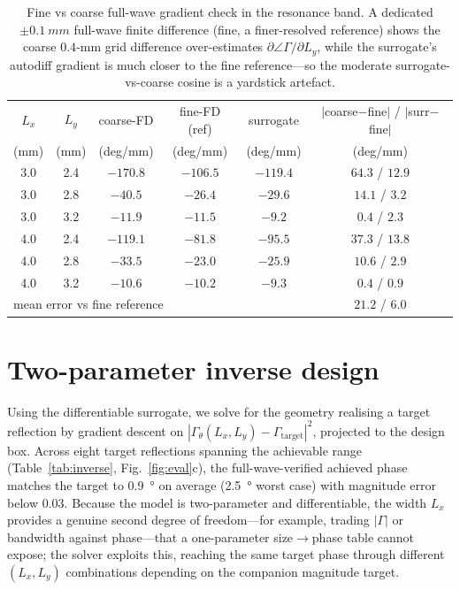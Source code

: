 \documentclass[11pt]{article}
\begin{document}
\begin{table}[!ht]\centering\small
\caption{Fine vs coarse full-wave gradient check in the resonance band. A dedicated $\pm\SI{0.1}{mm}$
full-wave finite difference (fine, a finer-resolved reference) shows the coarse $0.4$-mm grid difference
over-estimates $\partial\angle\Gamma/\partial L_y$, while the surrogate's autodiff gradient is much closer
to the fine reference---so the moderate surrogate-vs-coarse cosine is a yardstick artefact.}
\label{tab:finefd}
\begin{tabular}{cccccc}
\toprule
$L_x$ & $L_y$ & coarse-FD & fine-FD (ref) & surrogate & $|$coarse$-$fine$|$ / $|$surr$-$fine$|$ \\
(mm) & (mm) & (deg/mm) & (deg/mm) & (deg/mm) & (deg/mm) \\
\midrule
3.0 & 2.4 & $-170.8$ & $-106.5$ & $-119.4$ & $64.3$ / $\mathbf{12.9}$ \\
3.0 & 2.8 & $-40.5$  & $-26.4$  & $-29.6$  & $14.1$ / $\mathbf{3.2}$ \\
3.0 & 3.2 & $-11.9$  & $-11.5$  & $-9.2$   & $0.4$ / $2.3$ \\
4.0 & 2.4 & $-119.1$ & $-81.8$  & $-95.5$  & $37.3$ / $\mathbf{13.8}$ \\
4.0 & 2.8 & $-33.5$  & $-23.0$  & $-25.9$  & $10.6$ / $\mathbf{2.9}$ \\
4.0 & 3.2 & $-10.6$  & $-10.2$  & $-9.3$   & $0.4$ / $0.9$ \\
\midrule
\multicolumn{5}{l}{mean error vs fine reference} & $21.2$ / $\mathbf{6.0}$ \\
\bottomrule
\end{tabular}
\end{table}

\section{Two-parameter inverse design}\label{sec:inv}
Using the differentiable surrogate, we solve for the geometry realising a target reflection by gradient
descent on $|\Gamma_\theta(L_x,L_y)-\Gamma_\mathrm{target}|^2$, projected to the design box. Across eight
target reflections spanning the achievable range (Table~\ref{tab:inverse}, Fig.~\ref{fig:eval}c), the
full-wave-verified achieved phase matches the target to \SI{0.9}{\degree} on average (\SI{2.5}{\degree}
worst case) with magnitude error below $0.03$. Because the model is two-parameter and differentiable,
the width $L_x$ provides a genuine second degree of freedom---for example, trading $|\Gamma|$ or
bandwidth against phase---that a one-parameter size$\to$phase table cannot expose; the solver exploits
this, reaching the same target phase through different $(L_x,L_y)$ combinations depending on the
companion magnitude target.
\end{document}
